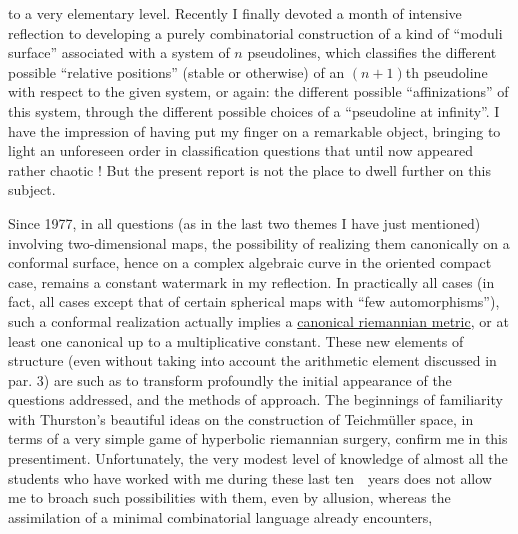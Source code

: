 
to a very elementary level. Recently I finally
devoted a month of intensive reflection to developing a
purely combinatorial construction of a kind of ``moduli surface''
associated with a system of $n$ pseudolines, which classifies the
different possible ``relative positions'' (stable or otherwise) of an
$(n+1)$th pseudoline with respect to the given system, or again:
the different possible ``affinizations'' of this system, through the
different possible choices of a ``pseudoline at infinity''. I
have the impression of having put my finger on a remarkable object,
bringing to light an unforeseen order in classification
questions that until now appeared rather chaotic !
But the present report is not the place to dwell further
on this subject.

Since 1977, in all questions (as in the
last two themes I have just mentioned) involving
two-dimensional maps, the possibility of realizing them canonically
on a conformal surface, hence on a complex algebraic
curve in the oriented compact case, remains a constant watermark
in my reflection. In practically all cases (in fact, all
cases except that of certain spherical maps with ``few automorphisms''),
such a conformal realization actually implies a
\uline{canonical riemannian metric}, or at least one canonical up to a
multiplicative constant. These new elements of structure
(even without taking into account the arithmetic element discussed
in par. 3) are such as to transform profoundly
the initial appearance of the questions addressed, and the methods of
approach. The beginnings of familiarity with Thurston's beautiful ideas
on the construction of Teichmüller space, in terms of a very
simple game of hyperbolic riemannian surgery, confirm me
in this presentiment. Unfortunately, the very modest level of knowledge
of almost all the students who have worked with me during
these last ten\ \ years does not allow me to broach such possibilities
with them, even by allusion, whereas
the assimilation of a minimal combinatorial language already encounters,

